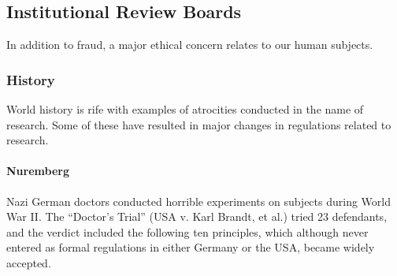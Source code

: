 \documentclass[12pt] {article}
\begin{document}
\subsection{Institutional Review
Boards}\label{institutional-review-boards}

In addition to fraud, a major ethical concern relates to our human
subjects.

\subsubsection{History}\label{history}

World history is rife with examples of atrocities conducted in the name
of research. Some of these have resulted in major changes in regulations
related to research.

\paragraph{Nuremberg}\label{nuremberg}

Nazi German doctors conducted horrible experiments on subjects during
World War II. The ``Doctor's Trial'' (USA v. Karl Brandt, et al.) tried
23 defendants, and the verdict included the following ten principles,
which although never entered as formal regulations in either Germany or
the USA, became widely accepted.
\end{document}
